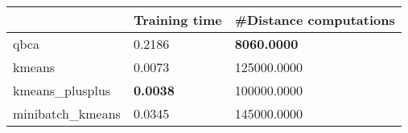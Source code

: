 \begin{table}[htbp]
\centering
\begin{tabular}{lll}
\toprule
 & Training time & #Distance computations \\
\midrule
qbca & 0.2186 & \textbf{8060.0000} \\
kmeans & 0.0073 & 125000.0000 \\
kmeans_plusplus & \textbf{0.0038} & 100000.0000 \\
minibatch_kmeans & 0.0345 & 145000.0000 \\
\bottomrule
\end{tabular}
\end{table}
